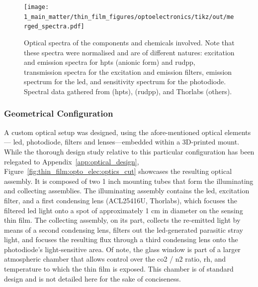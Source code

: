 \begin{figure}
	\texttt{[image: 1\_main\_matter/thin\_film\_figures/optoelectronics/tikz/out/merged\_spectra.pdf]}
	\caption[Optical spectra of the components and chemicals involved.]{Optical spectra of the components and chemicals involved. Note that these spectra were normalised and are of different natures: excitation and emission spectra for \gls{hpts} (anionic form) and \gls{rudpp}, transmission spectra for the excitation and emission filters, emission spectrum for the \gls{led}, and sensitivity spectrum for the photodiode. Spectral data gathered from \cite{wolfbeis1983} (\gls{hpts}), \cite{bultzingslowen2002} (\gls{rudpp}), and Thorlabs (others).}
	\label{fig:thin_film:opto_elec:merged_spectra}
\end{figure}

\subsubsection{Geometrical Configuration}\label{subsect:thin_film:opto_elec:geom_cons}

A custom optical setup was designed, using the afore-mentioned optical elements---\ie{} \gls{led}, photodiode, filters and lenses---embedded within a 3D-printed mount. While the thorough design study relative to this particular configuration has been relegated to Appendix~\ref{app:optical_design}, Figure~\ref{fig:thin_film:opto_elec:optics_cut} showcases the resulting optical assembly. It is composed of two 1 inch mounting tubes that form the illuminating and collecting assemblies. The illuminating assembly contains the \gls{led}, excitation filter, and a first condensing lens (ACL25416U, Thorlabs), which focuses the filtered \gls{led} light onto a spot of approximately 1 cm in diameter on the sensing thin film. The collecting assembly, on its part, collects the re-emitted light by means of a second condensing lens, filters out the \gls{led}-generated parasitic stray light, and focuses the resulting flux through a third condensing lens onto the photodiode's light-sensitive area. Of note, the glass window is part of a larger atmospheric chamber that allows control over the \gls{co2} / \gls{n2} ratio, \gls{rh}, and temperature to which the thin film is exposed. This chamber is of standard design and is not detailed here for the sake of conciseness.

